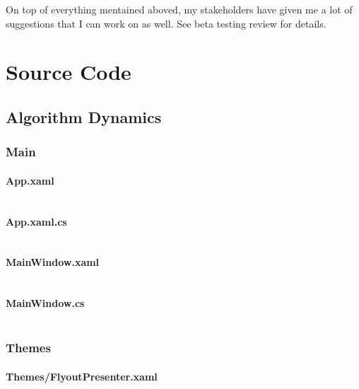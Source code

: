 \documentclass[a4paper]{report}
\begin{document}
On top of everything mentained aboved, my stakeholders have given me a lot of suggestions that I can work on as well. See beta testing review for details.

\chapter{Source Code}

\section{Algorithm Dynamics}

\subsection{Main}

\subsubsection{App.xaml}

\inputminted{xml}{"../src/Algorithm Dynamics/App.xaml"}

\subsubsection{App.xaml.cs}

\inputminted{csharp}{"../src/Algorithm Dynamics/App.xaml.cs"}

\subsubsection{MainWindow.xaml}

\inputminted{xml}{"../src/Algorithm Dynamics/MainWindow.xaml"}

\subsubsection{MainWindow.cs}

\inputminted{csharp}{"../src/Algorithm Dynamics/MainWindow.xaml.cs"}

\subsection{Themes}

\subsubsection{Themes/FlyoutPresenter.xaml}
\end{document}
